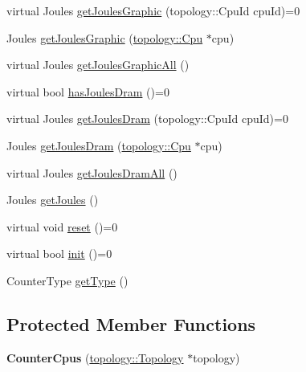 \begin{DoxyCompactItemize}
\item 
virtual Joules \hyperlink{classmammut_1_1energy_1_1CounterCpus_a436f91199f40af85ce1b561781f24459}{get\-Joules\-Graphic} (topology\-::\-Cpu\-Id cpu\-Id)=0
\item 
Joules \hyperlink{classmammut_1_1energy_1_1CounterCpus_aa2eebfba7422dd8dcc4d88bcb2522c4d}{get\-Joules\-Graphic} (\hyperlink{classmammut_1_1topology_1_1Cpu}{topology\-::\-Cpu} $\ast$cpu)
\item 
virtual Joules \hyperlink{classmammut_1_1energy_1_1CounterCpus_a2fc920fa0ccf3c297a6aa4cc5d7d947f}{get\-Joules\-Graphic\-All} ()
\item 
virtual bool \hyperlink{classmammut_1_1energy_1_1CounterCpus_a3d8c64aac5808275abdb2b01a31cbc11}{has\-Joules\-Dram} ()=0
\item 
virtual Joules \hyperlink{classmammut_1_1energy_1_1CounterCpus_a832e466d0a1f40f347d9a0211059a762}{get\-Joules\-Dram} (topology\-::\-Cpu\-Id cpu\-Id)=0
\item 
Joules \hyperlink{classmammut_1_1energy_1_1CounterCpus_a0633728131c4e450a5f4de60ca0c76a7}{get\-Joules\-Dram} (\hyperlink{classmammut_1_1topology_1_1Cpu}{topology\-::\-Cpu} $\ast$cpu)
\item 
virtual Joules \hyperlink{classmammut_1_1energy_1_1CounterCpus_ab818873ea2311617efdb5385da0da8ee}{get\-Joules\-Dram\-All} ()
\item 
Joules \hyperlink{classmammut_1_1energy_1_1CounterCpus_a6f6471724522433e88f07d60456671e5}{get\-Joules} ()
\item 
virtual void \hyperlink{classmammut_1_1energy_1_1CounterCpus_ac3d2b3c06119c5e4f077b05689b2374a}{reset} ()=0
\item 
virtual bool \hyperlink{classmammut_1_1energy_1_1CounterCpus_af4496166c7b79cd60fe57baa4b6e72a1}{init} ()=0
\item 
Counter\-Type \hyperlink{classmammut_1_1energy_1_1CounterCpus_ad84d1173e2629965b2e2bcc823e028b7}{get\-Type} ()
\end{DoxyCompactItemize}
\subsection*{Protected Member Functions}
\begin{DoxyCompactItemize}
\item 
\hypertarget{classmammut_1_1energy_1_1CounterCpus_a0a27e24202f786849a1dc5b2aaec97f9}{{\bfseries Counter\-Cpus} (\hyperlink{classmammut_1_1topology_1_1Topology}{topology\-::\-Topology} $\ast$topology)}\label{classmammut_1_1energy_1_1CounterCpus_a0a27e24202f786849a1dc5b2aaec97f9}

\end{DoxyCompactItemize}
